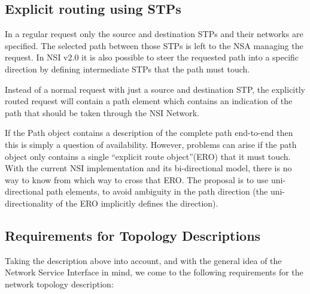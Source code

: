 \documentclass[12pt]{article}  %
\begin{document}
\subsection{Explicit routing using STPs}

In a regular request only the source and destination STPs and 
their networks are specified. The selected path between those STPs is left to the 
NSA managing the request. In NSI v2.0 it is also possible to steer the requested 
path into a specific direction by defining intermediate STPs that the path must 
touch.

Instead of a normal request with just a source and destination 
STP, the explicitly routed request will contain a path element which contains an 
indication of the path that should be taken through the NSI Network.

If the Path object contains a description of the complete path 
end-to-end then this is simply a question of availability. However, problems can 
arise if the path object only contains a single ``explicit route object''(ERO) 
that it must touch. With the current NSI implementation and its bi-directional 
model, there is no way to know from which way to cross that ERO. The proposal is 
to use uni-directional path elements, to avoid ambiguity in the path direction 
(the uni-directionality of the ERO implicitly defines the direction).


\subsection{Requirements for Topology Descriptions}

Taking the description above into account, and with the general 
idea of the Network Service Interface in mind, we come to the following requirements 
for the network topology description:
\end{document}
